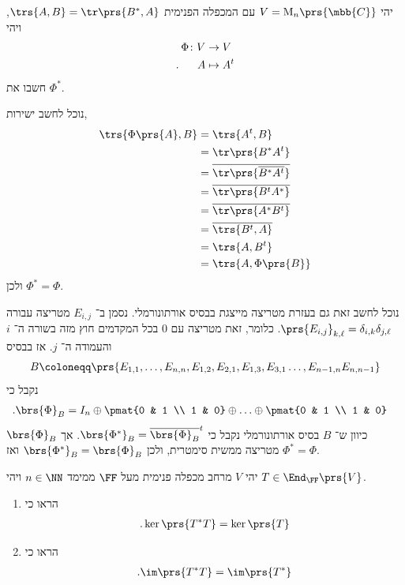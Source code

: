 \documentclass[a4paper,10pt,twoside,openany]{book}
\renewcommand{\Mat}{\mathrm{M}}
\begin{document}
\begin{exercisechap}
יהי
$V = \Mat_n\prs{\mbb{C}}$
עם המכפלה הפנימית
$\trs{A,B} = \tr\prs{B^*, A}$,
ויהי
\begin{align*}
    \Phi \colon V &\to V \\
    \text{.} \hphantom{lala} A &\mapsto A^t
\end{align*}
חשבו את
$\Phi^*$.
\end{exercisechap}

\begin{solution}
נוכל לחשב ישירות,
\begin{align*}
    \trs{\Phi\prs{A},B} &= \trs{A^t, B} \\&= \tr\prs{B^* A^t} \\&= \overline{\tr\prs{\overline{B^* A^t}}} \\&= \overline{\tr\prs{B^t A^*}} \\&= \overline{\tr\prs{A^* B^t}} \\&= \overline{\trs{B^t, A}} \\&= \trs{A, B^t} \\&= \trs{A, \Phi\prs{B}}
\end{align*}
ולכן
$\Phi^* = \Phi$.

נוכל לחשב זאת גם בעזרת מטריצה מייצגת בבסיס אורתונורמלי.
נסמן ב־%
$E_{i,j}$
מטריצה עבורה
$\prs{E_{i,j}}_{k,\ell} = \delta_{i,k} \delta_{j,\ell}$.
כלומר, זאת מטריצה עם
$0$
בכל המקדמים חוץ מזה בשורה ה־%
$i$
והעמודה ה־%
$j$.
אז בבסיס
\[B \coloneqq \prs{E_{1,1}, \ldots, E_{n,n}, E_{1,2}, E_{2,1}, E_{1,3}, E_{3,1} \ldots, E_{n-1, n} E_{n,n-1}}\]
נקבל כי
\begin{align*}
    \text{.} \brs{\Phi}_B &= I_n \oplus \pmat{0 & 1 \\ 1 & 0} \oplus \ldots \oplus \pmat{0 & 1 \\ 1 & 0}
\end{align*}
כיוון ש־%
$B$
בסיס אורתונורמלי
נקבל כי
$\brs{\Phi^*}_B = \overline{\brs{\Phi}_B}^t$.
אך
$\brs{\Phi}_B$
מטריצה ממשית סימטרית, ולכן
$\brs{\Phi^*}_B = \brs{\Phi}_B$
ואז
$\Phi^* = \Phi$.
\end{solution}

\begin{exercisechap}
יהי
$V$
מרחב מכפלה פנימית מעל
$\FF$
ממימד
$n \in \NN$
ויהי
$T \in \End_\FF\prs{V}$.

\begin{enumerate}
\item הראו כי
\begin{align*}
\text{.} \ker\prs{T^* T} = \ker\prs{T}
\end{align*}

\item הראו כי
\begin{align*}
\text{.} \im\prs{T^* T} = \im\prs{T^*}
\end{align*}
\end{enumerate}
\end{exercisechap}
\end{document}
